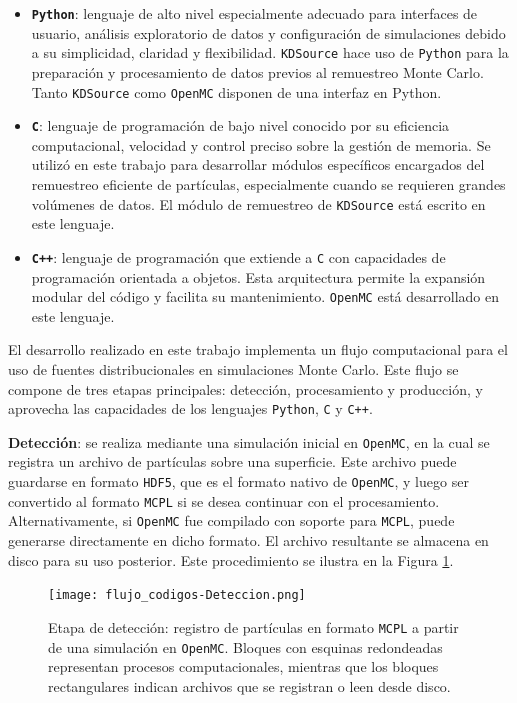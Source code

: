 \begin{itemize}
    \item \textbf{\texttt{Python}}: lenguaje de alto nivel especialmente adecuado para interfaces de usuario, análisis exploratorio de datos y configuración de simulaciones debido a su simplicidad, claridad y flexibilidad. \texttt{KDSource} hace uso de \texttt{Python} para la preparación y procesamiento de datos previos al remuestreo Monte Carlo. Tanto \texttt{KDSource} como \texttt{OpenMC} disponen de una interfaz en Python.

    \item \textbf{\texttt{C}}: lenguaje de programación de bajo nivel conocido por su eficiencia computacional, velocidad y control preciso sobre la gestión de memoria. Se utilizó en este trabajo para desarrollar módulos específicos encargados del remuestreo eficiente de partículas, especialmente cuando se requieren grandes volúmenes de datos. El módulo de remuestreo de \texttt{KDSource} está escrito en este lenguaje.
    
    \item \textbf{\texttt{C++}}: lenguaje de programación que extiende a \texttt{C} con capacidades de programación orientada a objetos. Esta arquitectura permite la expansión modular del código y facilita su mantenimiento. \texttt{OpenMC} está desarrollado en este lenguaje.


\end{itemize}


El desarrollo realizado en este trabajo implementa un flujo computacional para el uso de fuentes distribucionales en simulaciones Monte Carlo. Este flujo se compone de tres etapas principales: detección, procesamiento y producción, y aprovecha las capacidades de los lenguajes \texttt{Python}, \texttt{C} y \texttt{C++}.

\textbf{Detección}: se realiza mediante una simulación inicial en \texttt{OpenMC}, en la cual se registra un archivo de partículas sobre una superficie. Este archivo puede guardarse en formato \texttt{HDF5}, que es el formato nativo de \texttt{OpenMC}, y luego ser convertido al formato \texttt{MCPL} si se desea continuar con el procesamiento. Alternativamente, si \texttt{OpenMC} fue compilado con soporte para \texttt{MCPL}, puede generarse directamente en dicho formato. El archivo resultante se almacena en disco para su uso posterior. Este procedimiento se ilustra en la Figura \ref{fig:flujo_deteccion}.

\begin{figure}[H]
    \centering
    \texttt{[image: flujo\_codigos-Deteccion.png]}
    \caption{Etapa de detección: registro de partículas en formato \texttt{MCPL} a partir de una simulación en \texttt{OpenMC}. Bloques con esquinas redondeadas representan procesos computacionales, mientras que los bloques rectangulares indican archivos que se registran o leen desde disco.}
    \label{fig:flujo_deteccion}
\end{figure}

